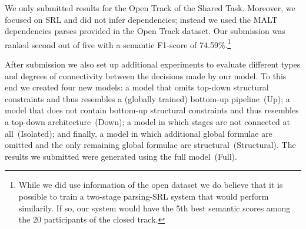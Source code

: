 We only submitted results for the Open Track of the Shared Task. Moreover, we focused on SRL and did not infer dependencies; instead we used the MALT dependencies parses provided in the Open Track dataset. Our submission was ranked second out of five with a semantic F1-score of 74.59\%.\footnote{While we did use information of the open dataset we do believe that it is possible to train a two-stage parsing-SRL system that would perform similarily. If so, our system would have the 5th best semantic scores among the 20 participants of the closed track. }  

After submission we also set up additional experiments to evaluate different types and degrees of connectivity between the decisions made by our model. To this end we created four new models: a model that omits top-down structural constraints and thus resembles a (globally trained) bottom-up pipeline~(Up); a model that does not contain bottom-up structural constraints and thus resembles a top-down architecture~(Down); a model in which stages are not connected at all~(Isolated); and finally, a model in which additional global formulae are omitted and the only remaining global formulae are structural~(Structural). The results we submitted were generated using the full model~(Full).



